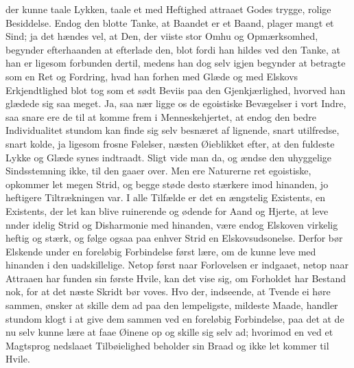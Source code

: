 \documentclass[12pt,a4paper]{book}
\newcommand{\apage}[1]{\marginnote{\footnotesize\textit{[#1]}}}
\begin{document}
der kunne taale Lykken, taale et med Heftighed attraaet Godes trygge,
rolige Besiddelse. Endog den blotte Tanke, at Baandet er et Baand,
plager mangt et Sind; \apage{85} ja det hændes vel, at Den, der viiste stor Omhu og
Opmærksomhed, begynder efterhaanden at efterlade den, blot fordi han
hildes ved den Tanke, at han er ligesom forbunden dertil, medens han dog
selv igjen begynder at betragte som en Ret og Fordring, hvad han forhen
med Glæde og med Elskovs Erkjendtlighed blot tog som et sødt Beviis paa
den Gjenkjærlighed, hvorved han glædede sig saa meget. Ja, saa nær ligge
os de egoistiske Bevægelser i vort Indre, saa snare ere de til at komme
frem i Menneskehjertet, at endog den bedre Individualitet stundom kan
finde sig selv besnæret af lignende, snart utilfredse, snart kolde, ja
ligesom frosne Følelser, næsten Øieblikket efter, at den fuldeste Lykke
og Glæde synes indtraadt. Sligt vide man da, og ændse den uhyggelige
Sindsstemning ikke, til den gaaer over. Men ere Naturerne ret
egoistiske, opkommer let megen Strid, og begge støde desto stærkere imod
hinanden, jo heftigere Tiltrækningen var. I alle Tilfælde er det en
ængstelig Existents, en Existents, der let kan blive ruinerende og
ødende for Aand og Hjerte, at leve nnder idelig Strid og Disharmonie med
hinanden, være endog Elskoven virkelig heftig og stærk, og følge ogsaa
paa enhver Strid en Elskovsudsonelse. Derfor bør Elskende under en
foreløbig Forbindelse først lære, om de kunne leve med hinanden i den
uadskillelige. Netop først naar Forlovelsen er indgaaet, netop naar
Attraaen har funden sin første Hvile, kan det vise sig, om Forholdet har
Bestand nok, for at det næste Skridt bør \apage{86} voves. Hvo der, indseende, at
Tvende ei høre sammen, ønsker at skille dem ad paa den lempeligste,
mildeste Maade, handler stundom klogt i at give dem sammen ved en
foreløbig Forbindelse, paa det at de nu selv kunne lære at faae Øinene
op og skille sig selv ad; hvorimod en ved et Magtsprog nedslaaet
Tilbøielighed beholder sin Braad og ikke let kommer til Hvile.
\end{document}
